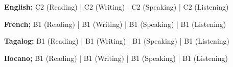 \begin{zitemize}
\item \textbf{English;} C2 (Reading) | C2 (Writing) | C2 (Speaking) | C2 (Listening)    
\item \textbf{French;} B1 (Reading) | B1 (Writing) | B1 (Speaking) | B1 (Listening)   
\item \textbf{Tagalog;} B1 (Reading) | B1 (Writing) | B1 (Speaking) | B1 (Listening)  
\item \textbf{Ilocano;} B1 (Reading) | B1 (Writing) | B1 (Speaking) | B1 (Listening)
\end{zitemize}